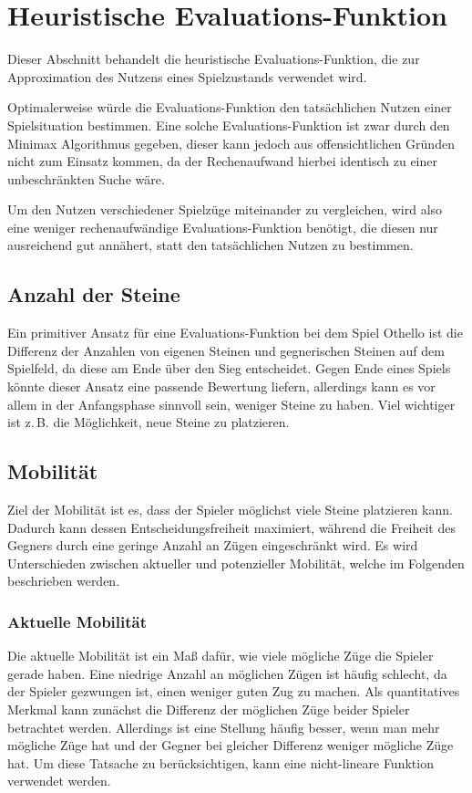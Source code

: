 \section{Heuristische Evaluations-Funktion}
\label{sec:heuristic}
Dieser Abschnitt behandelt die heuristische Evaluations-Funktion, die zur Approximation des Nutzens eines Spielzustands
verwendet wird.

Optimalerweise würde die Evaluations-Funktion den tatsächlichen Nutzen einer Spielsituation bestimmen. Eine solche
Evaluations-Funktion ist zwar durch den Minimax Algorithmus gegeben, dieser kann jedoch aus offensichtlichen Gründen
nicht zum Einsatz kommen, da der Rechenaufwand hierbei identisch zu einer unbeschränkten Suche wäre.

Um den Nutzen verschiedener Spielzüge miteinander zu vergleichen, wird also eine weniger rechenaufwändige
Evaluations-Funktion benötigt, die diesen nur ausreichend gut annähert, statt den tatsächlichen Nutzen zu bestimmen.

\subsection{Anzahl der Steine}
\label{sec:disccount}
Ein primitiver Ansatz für eine Evaluations-Funktion bei dem Spiel Othello ist die Differenz der Anzahlen von eigenen
Steinen und gegnerischen Steinen auf dem Spielfeld, da diese am Ende über den Sieg entscheidet. Gegen Ende eines Spiels
könnte dieser Ansatz eine passende Bewertung liefern, allerdings kann es vor allem in der Anfangsphase sinnvoll sein,
weniger Steine zu haben. Viel wichtiger ist z.\,B. die Möglichkeit, neue Steine zu platzieren.

\subsection{Mobilität}
\label{sec:mobility}
Ziel der Mobilität ist es, dass der Spieler möglichst viele Steine platzieren kann. Dadurch kann dessen
Entscheidungsfreiheit maximiert, während die Freiheit des Gegners durch eine geringe Anzahl an Zügen eingeschränkt wird.
Es wird Unterschieden zwischen aktueller und potenzieller Mobilität, welche im Folgenden beschrieben werden.

\subsubsection{Aktuelle Mobilität}
\label{sec:theorycurrentmobility}
Die aktuelle Mobilität ist ein Maß dafür, wie viele mögliche Züge die Spieler gerade haben. Eine niedrige Anzahl an
möglichen Zügen ist häufig schlecht, da der Spieler gezwungen ist, einen weniger guten Zug zu machen. Als quantitatives
Merkmal kann zunächst die Differenz der möglichen Züge beider Spieler betrachtet werden. Allerdings ist eine Stellung
häufig besser, wenn man mehr mögliche Züge hat und der Gegner bei gleicher Differenz weniger mögliche Züge hat. Um diese
Tatsache zu berücksichtigen, kann eine nicht-lineare Funktion verwendet werden.
\cite[S. 7]{evaluationfunctions}

